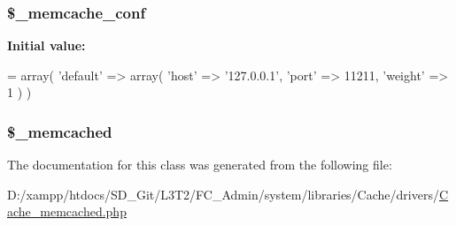 \subsubsection[{\$\+\_\+memcache\+\_\+conf}]{\setlength{\rightskip}{0pt plus 5cm}\$\+\_\+memcache\+\_\+conf\hspace{0.3cm}{\ttfamily [protected]}}\label{class_c_i___cache__memcached_a31577b029b5c3ce5002b0d30ac01b261}
{\bfseries Initial value\+:}
\begin{DoxyCode}
= array(
        \textcolor{stringliteral}{'default'} => array(
            \textcolor{stringliteral}{'host'}      => \textcolor{stringliteral}{'127.0.0.1'},
            \textcolor{stringliteral}{'port'}      => 11211,
            \textcolor{stringliteral}{'weight'}    => 1
        )
    )
\end{DoxyCode}
\hypertarget{class_c_i___cache__memcached_a9ce5188201bbc41ed4374947a35dadcc}{}
\subsubsection[{\$\+\_\+memcached}]{\setlength{\rightskip}{0pt plus 5cm}\$\+\_\+memcached\hspace{0.3cm}{\ttfamily [protected]}}\label{class_c_i___cache__memcached_a9ce5188201bbc41ed4374947a35dadcc}


The documentation for this class was generated from the following file\+:\begin{DoxyCompactItemize}
\item 
D\+:/xampp/htdocs/\+S\+D\+\_\+\+Git/\+L3\+T2/\+F\+C\+\_\+\+Admin/system/libraries/\+Cache/drivers/\hyperlink{_cache__memcached_8php}{Cache\+\_\+memcached.\+php}\end{DoxyCompactItemize}
